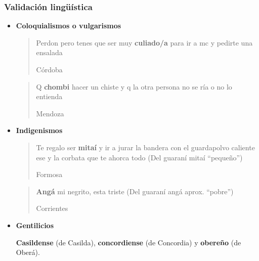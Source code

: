 \begin{frame}[t]\frametitle{Validación lingüística}

   \begin{itemize}

      \label{it:caracterizacionLinguistica}

      \item \textbf{Coloquialismos o vulgarismos}

      \blockquote[Córdoba]{Perdon pero tenes que ser muy \textbf{culiado/a} para ir a mc y pedirte una ensalada}


      \blockquote[Mendoza]{Q \textbf{chombi} hacer un chiste y q la otra persona no se ría o no lo entienda}





      \item \textbf{Indigenismos}

      \blockquote[Formosa]{Te regalo ser \textbf{mitaí} y ir a jurar la bandera con el guardapolvo caliente ese y la corbata que te ahorca todo (Del guaraní mitaí “pequeño”)}

      \blockquote[Corrientes]{\textbf{Angá} mi negrito, esta triste (Del guaraní angá aprox. “pobre”)}

      \item \textbf{Gentilicios}

      \textbf{Casildense} (de Casilda), \textbf{concordiense} (de Concordia) y \textbf{obereño} (de Oberá).

\end{itemize}





\end{frame}

